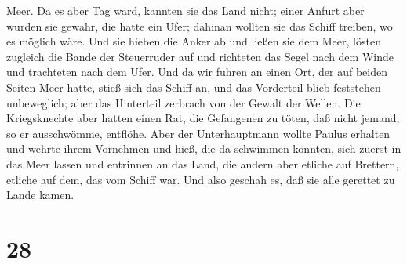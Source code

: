 Meer.  Da es aber Tag ward, kannten sie das Land nicht;
einer Anfurt aber wurden sie gewahr, die hatte ein Ufer; dahinan wollten
sie das Schiff treiben, wo es möglich wäre.  Und sie hieben
die Anker ab und ließen sie dem Meer, lösten zugleich die Bande der
Steuerruder auf und richteten das Segel nach dem Winde und trachteten
nach dem Ufer.  Und da wir fuhren an einen Ort, der auf
beiden Seiten Meer hatte, stieß sich das Schiff an, und das Vorderteil
blieb feststehen unbeweglich; aber das Hinterteil zerbrach von der
Gewalt der Wellen.  Die Kriegsknechte aber hatten einen
Rat, die Gefangenen zu töten, daß nicht jemand, so er ausschwömme,
entflöhe.  Aber der Unterhauptmann wollte Paulus erhalten
und wehrte ihrem Vornehmen und hieß, die da schwimmen könnten, sich
zuerst in das Meer lassen und entrinnen an das Land,  die
andern aber etliche auf Brettern, etliche auf dem, das vom Schiff war.
Und also geschah es, daß sie alle gerettet zu Lande kamen.

\hypertarget{section-27}{%
\section{28}\label{section-27}}

